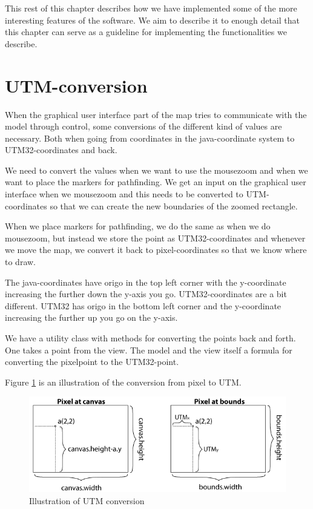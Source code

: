 This rest of this chapter describes how we have implemented some of the more
interesting features of the software. We aim to describe it to enough detail that this
chapter can serve as a guideline for implementing the functionalities we
describe.

\section{UTM-conversion}
\label{IMPL-UTM}
When the graphical user interface part of the map tries to communicate with the
model through control, some conversions of the different kind of values are
necessary. Both when going from coordinates in the java-coordinate system to
UTM32-coordinates and back.

We need to convert the values when we want to use the mousezoom and when we want
to place the markers for pathfinding. We get an input on the graphical user
interface when we mousezoom and this needs to be converted to UTM-coordinates so
that we can create the new boundaries of the zoomed rectangle.

When we place markers for pathfinding, we do the same as when we do mousezoom,
but instead we store the point as UTM32-coordinates and whenever we move the
map, we convert it back to pixel-coordinates so that we know where to draw.

The java-coordinates have origo in the top left corner with the y-coordinate
increasing the further down the y-axis you go. UTM32-coordinates are a bit
different. UTM32 has origo in the bottom left corner and the y-coordinate
increasing the further up you go on the y-axis.

We have a utility class with methods for converting the points back and forth.
One takes a point from the view. The model and the view itself a formula
for converting the pixelpoint to the UTM32-point.

Figure \ref{fig:UTMconversion} is an illustration of the conversion from pixel to UTM.

\begin{figure}[!ht]
\centering
\includegraphics[width=1\linewidth]{images/UTMillu}
\caption{Illustration of UTM conversion}
\label{fig:UTMconversion}
\end{figure}

